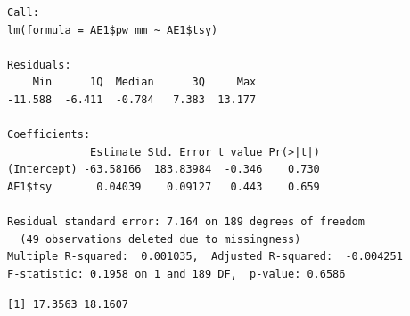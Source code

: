 \documentclass[
  10pt,
  a4paper,oneside]{article}
\newenvironment{Shaded}{\begin{snugshade}}{\end{snugshade}}
\newcommand{\AttributeTok}[1]{\textcolor[rgb]{0.77,0.63,0.00}{#1}}
\newcommand{\DecValTok}[1]{\textcolor[rgb]{0.00,0.00,0.81}{#1}}
\newcommand{\DocumentationTok}[1]{\textcolor[rgb]{0.56,0.35,0.01}{\textbf{\textit{#1}}}}
\newcommand{\FunctionTok}[1]{\textcolor[rgb]{0.00,0.00,0.00}{#1}}
\newcommand{\NormalTok}[1]{#1}
\newcommand{\OtherTok}[1]{\textcolor[rgb]{0.56,0.35,0.01}{#1}}
\newcommand{\SpecialCharTok}[1]{\textcolor[rgb]{0.00,0.00,0.00}{#1}}
\newcommand{\StringTok}[1]{\textcolor[rgb]{0.31,0.60,0.02}{#1}}
\begin{document}
\begin{verbatim}
Call:
lm(formula = AE1$pw_mm ~ AE1$tsy)

Residuals:
    Min      1Q  Median      3Q     Max 
-11.588  -6.411  -0.784   7.383  13.177 

Coefficients:
             Estimate Std. Error t value Pr(>|t|)
(Intercept) -63.58166  183.83984  -0.346    0.730
AE1$tsy       0.04039    0.09127   0.443    0.659

Residual standard error: 7.164 on 189 degrees of freedom
  (49 observations deleted due to missingness)
Multiple R-squared:  0.001035,  Adjusted R-squared:  -0.004251 
F-statistic: 0.1958 on 1 and 189 DF,  p-value: 0.6586
\end{verbatim}

\begin{Shaded}
\end{Shaded}

\begin{verbatim}
[1] 17.3563 18.1607
\end{verbatim}

\begin{Shaded}
\end{Shaded}
\end{document}
